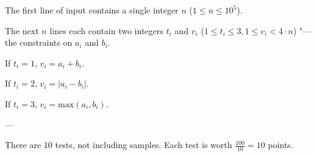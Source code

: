 The first line of input contains a single integer $n$ ($1 \le n \le 10^5$).

The next $n$ lines each contain two integers $t_i$ and $v_i$ ($1 \le t_i \le 3, 1 \le v_i < 4 \cdot n$) "--- the constraints on $a_i$ and $b_i$.

If $t_i=1$, $v_i=a_i+b_i$.

If $t_i=2$, $v_i=|a_i-b_i|$.

If $t_i=3$, $v_i=\text{max}(a_i, b_i)$.

---

There are $10$ tests, not including samples. Each test is worth $\frac{100}{10}=10$ points.
